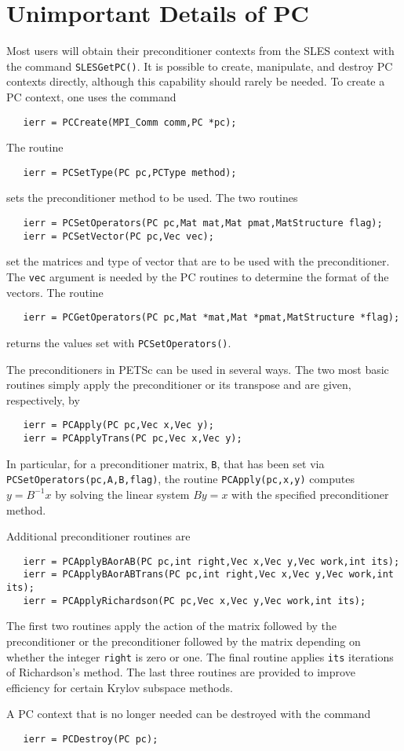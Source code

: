 \section{Unimportant Details of PC}

Most users will obtain their preconditioner contexts from the SLES
context with the command {\tt SLESGetPC()}. It is possible to create,
manipulate, and destroy PC contexts directly, although this capability
should rarely be needed. To create a PC context, one uses the command
\begin{verbatim}
   ierr = PCCreate(MPI_Comm comm,PC *pc);
\end{verbatim}
The routine 
\begin{verbatim}
   ierr = PCSetType(PC pc,PCType method);
\end{verbatim}
sets the preconditioner method to be used. 
The two routines  
\begin{verbatim}
   ierr = PCSetOperators(PC pc,Mat mat,Mat pmat,MatStructure flag);
   ierr = PCSetVector(PC pc,Vec vec);
\end{verbatim}
set the matrices and type of vector that are to be used with 
the preconditioner.  The {\tt vec} argument is needed by the PC routines 
to determine the format of the vectors. 
The routine 
\begin{verbatim}
   ierr = PCGetOperators(PC pc,Mat *mat,Mat *pmat,MatStructure *flag);
\end{verbatim}
returns the values set with {\tt PCSetOperators()}.

  
The preconditioners in PETSc can be used in several ways.  The two
most basic routines simply apply the preconditioner or its transpose
and are given, respectively, by
\begin{verbatim}
   ierr = PCApply(PC pc,Vec x,Vec y);
   ierr = PCApplyTrans(PC pc,Vec x,Vec y);
\end{verbatim}
In particular, for a preconditioner matrix, {\tt B}, that has
been set via {\tt PCSetOperators(pc,A,B,flag)},
the routine {\tt PCApply(pc,x,y)} computes $y = B^{-1} x$
by solving the linear system $By = x$ with the specified preconditioner
method.

 
Additional preconditioner routines are
\begin{verbatim}
   ierr = PCApplyBAorAB(PC pc,int right,Vec x,Vec y,Vec work,int its);
   ierr = PCApplyBAorABTrans(PC pc,int right,Vec x,Vec y,Vec work,int its);
   ierr = PCApplyRichardson(PC pc,Vec x,Vec y,Vec work,int its);
\end{verbatim}
The first two routines apply the action of the matrix followed by the
preconditioner or the preconditioner followed by the matrix depending
on whether the  integer {\tt right} is
zero or one. The final routine applies {\tt its} iterations of
Richardson's method. The last three routines are provided to improve
efficiency for certain Krylov subspace methods.

A PC context that is no longer needed can be destroyed with the 
command 
\begin{verbatim}
   ierr = PCDestroy(PC pc);
\end{verbatim}

